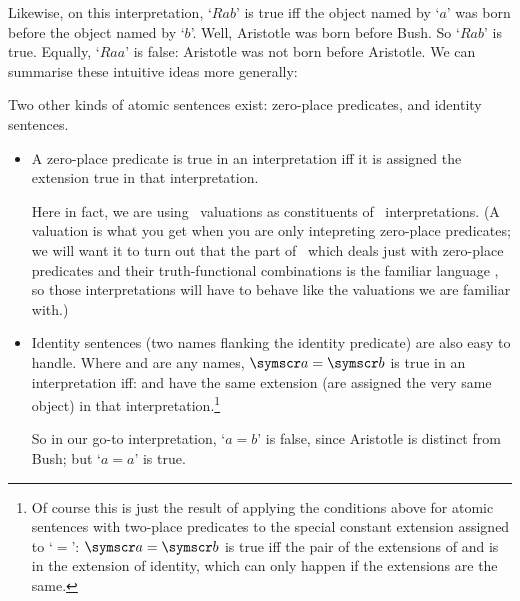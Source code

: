 Likewise, on this interpretation, `$Rab$' is true iff the object named by `$a$' was born before the object named by `$b$'. Well, Aristotle was born before Bush. So `$Rab$' is true. Equally, `$Raa$' is false: Aristotle was not born before Aristotle. We can summarise these intuitive ideas more generally:

Two other kinds of atomic sentences exist: zero-place predicates, and identity sentences.
\begin{itemize}
	\item A zero-place predicate is true in an interpretation iff it is assigned the extension true in that interpretation.

	Here in fact, we are using \TFL\ valuations as constituents of \FOL\ interpretations. (A valuation is what you get when you are only intepreting zero-place predicates; we will want it to turn out that the part of \FOL\ which deals just with zero-place predicates and their truth-functional combinations is the familiar language \TFL, so those interpretations will have to behave like the valuations we are familiar with.)
		\item Identity sentences (two names flanking the identity predicate) are also easy to handle. Where  and  are any names, $\meta{a} = \meta{b}$ is true in an interpretation  iff:
		  and  have the same extension (are assigned the very same object) in that interpretation.\footnote{Of course this is just the result of applying the conditions above for atomic sentences with two-place predicates to the special constant extension assigned to `$=$': $\meta{a}=\meta{b}$ is true iff the pair of the extensions of  and  is in the extension of identity, which can only happen if the extensions are the same.}

So in our go-to interpretation, `$a = b$' is false, since Aristotle is distinct from Bush; but `$a=a$' is true.
\end{itemize}


